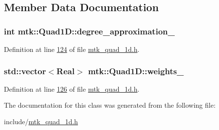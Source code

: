 \subsection{Member Data Documentation}
\hypertarget{classmtk_1_1Quad1D_aaff281c19f70faeb07f610fcffb300c5}{
\subsubsection[{degree\+\_\+approximation\+\_\+}]{\setlength{\rightskip}{0pt plus 5cm}int mtk\+::\+Quad1\+D\+::degree\+\_\+approximation\+\_\+\hspace{0.3cm}{\ttfamily [private]}}}\label{classmtk_1_1Quad1D_aaff281c19f70faeb07f610fcffb300c5}


Definition at line \hyperlink{mtk__quad__1d_8h_source_l00124}{124} of file \hyperlink{mtk__quad__1d_8h_source}{mtk\+\_\+quad\+\_\+1d.\+h}.

\hypertarget{classmtk_1_1Quad1D_abce6b19c2e089bc0691ef7623ec6d994}{
\subsubsection[{weights\+\_\+}]{\setlength{\rightskip}{0pt plus 5cm}std\+::vector$<${\bf Real}$>$ mtk\+::\+Quad1\+D\+::weights\+\_\+\hspace{0.3cm}{\ttfamily [private]}}}\label{classmtk_1_1Quad1D_abce6b19c2e089bc0691ef7623ec6d994}


Definition at line \hyperlink{mtk__quad__1d_8h_source_l00126}{126} of file \hyperlink{mtk__quad__1d_8h_source}{mtk\+\_\+quad\+\_\+1d.\+h}.



The documentation for this class was generated from the following file\+:\begin{DoxyCompactItemize}
\item 
include/\hyperlink{mtk__quad__1d_8h}{mtk\+\_\+quad\+\_\+1d.\+h}\end{DoxyCompactItemize}
